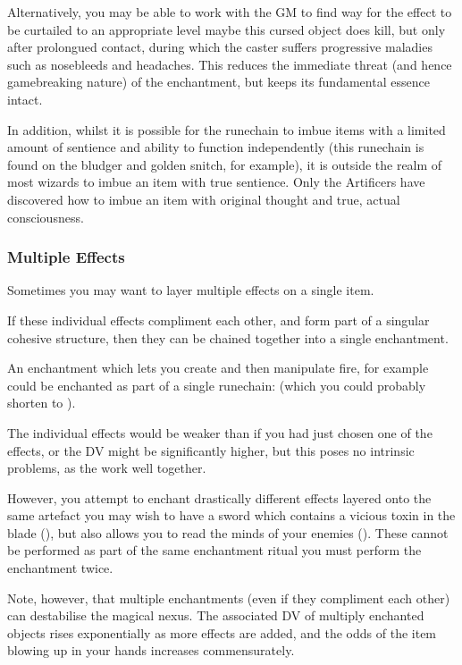 Alternatively, you may be able to work with the GM to find way for the effect to be curtailed to an appropriate level \minus{} maybe this cursed object does kill, but only after prolongued contact, during which the caster suffers progressive maladies such as nosebleeds and headaches. This reduces the immediate threat (and hence game\minus{}breaking nature) of the enchantment, but keeps its fundamental essence intact. 

In addition, whilst it is possible for the runechain \rune{\aeternum\cingo\sensus} to imbue items with a limited amount of sentience and ability to function independently (this runechain is found on the bludger and golden snitch, for example), it is outside the realm of most wizards to imbue an item with true sentience. Only the Artificers have discovered how to imbue an item with original thought and true, actual consciousness. 

\subsubsection{Multiple Effects}

Sometimes you may want to layer multiple effects on a single item. 

If these individual effects compliment each other, and form part of a singular cohesive structure, then they can be chained together into a single enchantment. 

An enchantment which lets you create and then manipulate fire, for example could be enchanted as part of a single runechain: \rune{\lentus\genero\ignis\lentus\imperum\ignis} (which you could probably shorten to \rune{\lentus\genero\imperum\ignis}). 

The individual effects would be weaker than if you had just chosen one of the effects, or the DV might be significantly higher, but this poses no intrinsic problems, as the  work well together. 

However, you attempt to enchant drastically different effects layered onto the same artefact \minus{} you may wish to have a sword which contains a vicious toxin in the blade (\rune{\velox\perdero\morbus}), but also allows you to read the minds of your enemies (\rune{\aeternum\discite\sensus}). These cannot be performed as part of the same enchantment ritual \minus{} you must perform the enchantment twice. 

Note, however, that multiple enchantments (even if they compliment each other) can destabilise the magical nexus. The associated DV of multiply enchanted objects rises exponentially as more effects are added, and the odds of the item blowing up in your hands increases commensurately.  

